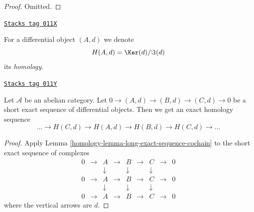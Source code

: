 \begin{proof}
Omitted.
\end{proof}

\begin{definition}
\label{homology-definition-differential-object-homology}
\href{https://stacks.math.columbia.edu/tag/011X}{\texttt{Stacks tag 011X}}

For a differential object $(A, d)$ we denote
$$
H(A, d) = \Ker(d)/\Im(d)
$$
its {\it homology}.
\end{definition}

\begin{lemma}
\label{homology-lemma-differential-objects-ses}
\href{https://stacks.math.columbia.edu/tag/011Y}{\texttt{Stacks tag 011Y}}

Let $\mathcal{A}$ be an abelian category.
Let $0 \to (A, d) \to (B, d) \to (C, d) \to 0$ be a short exact sequence
of differential objects. Then we get an exact homology sequence
$$
\ldots \to H(C, d) \to H(A, d) \to H(B, d) \to H(C, d) \to \ldots
$$
\end{lemma}

\begin{proof}

Apply Lemma \ref{homology-lemma-long-exact-sequence-cochain}
to the short exact sequence of complexes
$$
\begin{matrix}
0 & \to & A & \to & B & \to & C & \to & 0 \\
& & \downarrow & & \downarrow & & \downarrow \\
0 & \to & A & \to & B & \to & C & \to & 0 \\
& & \downarrow & & \downarrow & & \downarrow \\
0 & \to & A & \to & B & \to & C & \to & 0
\end{matrix}
$$
where the vertical arrows are $d$.
\end{proof}

